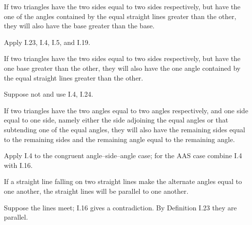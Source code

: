 \begin{claim}
\label{prop:I.24}
If two triangles have the two sides equal to two sides respectively,
but have the one of the angles contained by the equal straight lines
greater than the other, they will also have the base greater than the
base.
\end{claim}
\begin{evidence}[Proof of I.24]
\label{ev:I.24}
Apply I.23, I.4, I.5, and I.19.
\end{evidence}

\begin{claim}
\label{prop:I.25}
If two triangles have the two sides equal to two sides respectively,
but have the one base greater than the other, they will also have the
one angle contained by the equal straight lines greater than the
other.
\end{claim}
\begin{evidence}[Proof of I.25]
\label{ev:I.25}
Suppose not and use I.4, I.24.
\end{evidence}

\begin{claim}
\label{prop:I.26}
If two triangles have the two angles equal to two angles respectively,
and one side equal to one side, namely either the side adjoining the
equal angles or that subtending one of the equal angles, they will
also have the remaining sides equal to the remaining sides and the
remaining angle equal to the remaining angle.
\end{claim}
\begin{evidence}[Proof of I.26]
\label{ev:I.26}
Apply I.4 to the congruent angle--side--angle case; for the AAS case
combine I.4 with I.16.
\end{evidence}

\begin{claim}
\label{prop:I.27}
If a straight line falling on two straight lines make the alternate
angles equal to one another, the straight lines will be parallel to
one another.
\end{claim}
\begin{evidence}[Proof of I.27]
\label{ev:I.27}
Suppose the lines meet; I.16 gives a contradiction.  By Definition
I.23 they are parallel.
\end{evidence}

